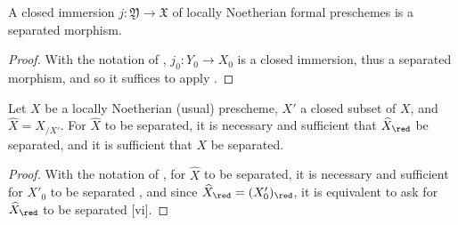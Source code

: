 \begin{proposition}[10.15.6]
\label{I.10.15.6}
A closed immersion $j:\mathfrak{Y}\to\mathfrak{X}$ of locally Noetherian formal preschemes is a separated morphism.
\end{proposition}

\begin{proof}
With the notation of , $j_0:Y_0\to X_0$ is a closed immersion, thus a separated morphism, and so it suffices to apply .
\end{proof}

\begin{proposition}[10.15.7]
\label{I.10.15.7}
Let $X$ be a locally Noetherian (usual) prescheme, $X'$ a closed subset of $X$, and $\widehat{X}=X_{/X'}$.
For $\widehat{X}$ to be separated, it is necessary and sufficient that $\widehat{X}_\red$ be separated, and it is sufficient that $X$ be separated.
\end{proposition}

\begin{proof}
With the notation of , for $\widehat{X}$ to be separated, it is necessary and sufficient for $X'_0$ to be separated , and since $\widehat{X}_\red=(X'_0)_\red$, it is equivalent to ask for $\widehat{X}_\red$ to be separated [vi].
\end{proof}
